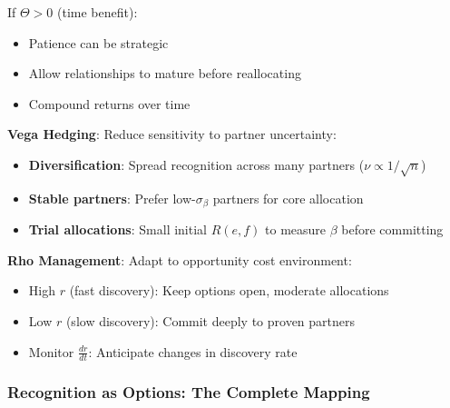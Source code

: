 If $\Theta > 0$ (time benefit):
\begin{itemize}
\item Patience can be strategic
\item Allow relationships to mature before reallocating
\item Compound returns over time
\end{itemize}

\textbf{Vega Hedging}:
Reduce sensitivity to partner uncertainty:
\begin{itemize}
\item \textbf{Diversification}: Spread recognition across many partners ($\nu \propto 1/\sqrt{n}$)
\item \textbf{Stable partners}: Prefer low-$\sigma_\beta$ partners for core allocation
\item \textbf{Trial allocations}: Small initial $R(e,f)$ to measure $\beta$ before committing
\end{itemize}

\textbf{Rho Management}:
Adapt to opportunity cost environment:
\begin{itemize}
\item High $r$ (fast discovery): Keep options open, moderate allocations
\item Low $r$ (slow discovery): Commit deeply to proven partners
\item Monitor $\frac{dr}{dt}$: Anticipate changes in discovery rate
\end{itemize}

\subsubsection{Recognition as Options: The Complete Mapping}

